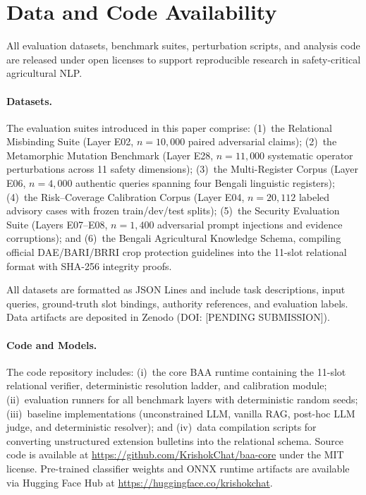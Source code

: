 \section{Data and Code Availability}
\label{sec:data_availability}

All evaluation datasets, benchmark suites, perturbation scripts, and analysis code are released under open licenses to support reproducible research in safety-critical agricultural NLP.

\paragraph{Datasets.}
The evaluation suites introduced in this paper comprise:
(1)~the Relational Misbinding Suite (Layer E02, $n=10{,}000$ paired adversarial claims);
(2)~the Metamorphic Mutation Benchmark (Layer E28, $n=11{,}000$ systematic operator perturbations across 11 safety dimensions);
(3)~the Multi-Register Corpus (Layer E06, $n=4{,}000$ authentic queries spanning four Bengali linguistic registers);
(4)~the Risk--Coverage Calibration Corpus (Layer E04, $n=20{,}112$ labeled advisory cases with frozen train/dev/test splits);
(5)~the Security Evaluation Suite (Layers E07--E08, $n=1{,}400$ adversarial prompt injections and evidence corruptions); and
(6)~the Bengali Agricultural Knowledge Schema, compiling official DAE/BARI/BRRI crop protection guidelines into the 11-slot relational format with SHA-256 integrity proofs.

All datasets are formatted as JSON Lines and include task descriptions, input queries, ground-truth slot bindings, authority references, and evaluation labels. Data artifacts are deposited in Zenodo (DOI: [PENDING SUBMISSION]).

\paragraph{Code and Models.}
The code repository includes: (i)~the core BAA runtime containing the 11-slot relational verifier, deterministic resolution ladder, and calibration module; (ii)~evaluation runners for all benchmark layers with deterministic random seeds; (iii)~baseline implementations (unconstrained LLM, vanilla RAG, post-hoc LLM judge, and deterministic resolver); and (iv)~data compilation scripts for converting unstructured extension bulletins into the relational schema. Source code is available at \url{https://github.com/KrishokChat/baa-core} under the MIT license. Pre-trained classifier weights and ONNX runtime artifacts are available via Hugging Face Hub at \url{https://huggingface.co/krishokchat}.
